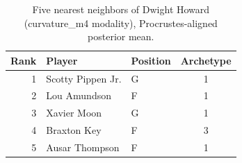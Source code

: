 \begin{table}[htbp]
  \centering\small
  \begin{tabular}{rllc}
    \toprule
    Rank & Player & Position & Archetype \\
    \midrule
    1 & Scotty Pippen Jr. & G & 1 \\
    2 & Lou Amundson & F & 1 \\
    3 & Xavier Moon & G & 1 \\
    4 & Braxton Key & F & 3 \\
    5 & Ausar Thompson & F & 1 \\
    \bottomrule
  \end{tabular}
  \caption{Five nearest neighbors of Dwight Howard (curvature_m4 modality), Procrustes-aligned posterior mean.}
  \label{tab:Dwight_Howard_neighbors_curvature_m4}
\end{table}

